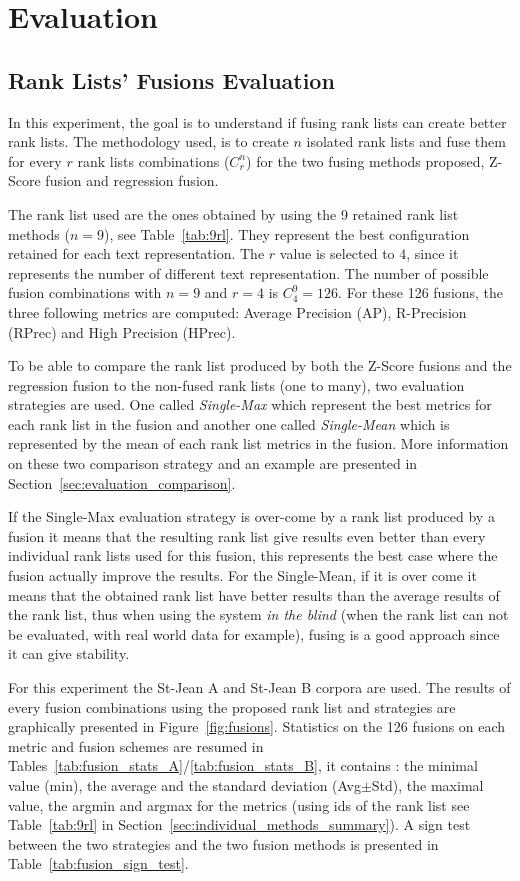\section{Evaluation}

\subsection{Rank Lists' Fusions Evaluation \label{sec:eval_fusion}}

In this experiment, the goal is to understand if fusing rank lists can create better rank lists.
The methodology used, is to create $n$ isolated rank lists and fuse them for every $r$ rank lists combinations ($C^n_r$) for the two fusing methods proposed, Z-Score fusion and regression fusion.

The rank list used are the ones obtained by using the 9 retained rank list methods ($n=9$), see Table~\ref{tab:9rl}.
They represent the best configuration retained for each text representation.
The $r$ value is selected to $4$, since it represents the number of different text representation.
The number of possible fusion combinations with $n=9$ and $r=4$ is $C^{9}_{4} = 126$.
For these 126 fusions, the three following metrics are computed: Average Precision (AP), R-Precision (RPrec) and High Precision (HPrec).

To be able to compare the rank list produced by both the Z-Score fusions and the regression fusion to the non-fused rank lists (one to many), two evaluation strategies are used.
One called \textit{Single-Max} which represent the best metrics for each rank list in the fusion and another one called \textit{Single-Mean} which is represented by the mean of each rank list metrics in the fusion.
More information on these two comparison strategy and an example are presented in Section~\ref{sec:evaluation_comparison}.

If the Single-Max evaluation strategy is over-come by a rank list produced by a fusion it means that the resulting rank list give results even better than every individual rank lists used for this fusion, this represents the best case where the fusion actually improve the results.
For the Single-Mean, if it is over come it means that the obtained rank list have better results than the average results of the rank list, thus when using the system \textit{in the blind} (when the rank list can not be evaluated, with real world data for example), fusing is a good approach since it can give stability.

For this experiment the St-Jean A and St-Jean B corpora are used.
The results of every fusion combinations using the proposed rank list and strategies are graphically presented in Figure~\ref{fig:fusions}.
Statistics on the 126 fusions on each metric and fusion schemes are resumed in Tables~\ref{tab:fusion_stats_A}/\ref{tab:fusion_stats_B}, it contains : the minimal value (min), the average and the standard deviation (Avg$\pm$Std), the maximal value, the argmin and argmax for the metrics (using ids of the rank list see Table~\ref{tab:9rl} in Section~\ref{sec:individual_methods_summary}).
A sign test between the two strategies and the two fusion methods is presented in Table~\ref{tab:fusion_sign_test}.

